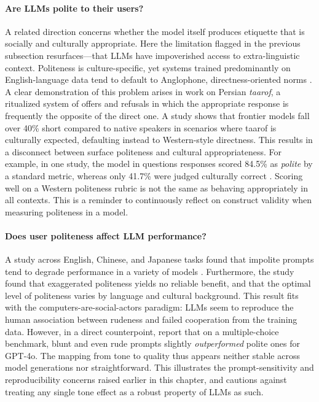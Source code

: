\paragraph{Are LLMs polite to their users?}
A related  direction concerns whether the model itself produces etiquette that is socially and culturally appropriate. Here the limitation flagged in the previous subsection resurfaces---that LLMs have impoverished access to extra-linguistic context. Politeness is  culture-specific, yet systems trained predominantly on English-language data tend to default to Anglophone, directness-oriented norms \citep{havaldar2023comparing}. A clear demonstration of this problem arises in work on Persian \emph{taarof}, a ritualized system of offers and refusals in which the appropriate response is frequently the opposite of the direct one. A study shows that frontier models fall over 40\% short compared to native speakers in scenarios where taarof is culturally expected, defaulting instead to Western-style directness. This results in a disconnect between surface politeness and cultural appropriateness. For example, in one study, the model in questions responses scored 84.5\% as {\em polite} by a standard metric, whereas only 41.7\% were judged culturally correct \citep{goharisadr2025taarof}. Scoring well on a Western politeness rubric %
is not the same as behaving appropriately in all contexts. This is a reminder to continuously reflect on construct validity when measuring politeness in a model.

\paragraph{Does user politeness affect LLM performance?} \label{sec:politeness}
A study  across English, Chinese, and Japanese tasks found  that impolite prompts tend to degrade performance in a variety of models \citep{yin-etal-2024-respect}. Furthermore, the study found that exaggerated politeness yields no reliable benefit, and that the optimal level of politeness varies by language and cultural background. This result fits with the computers-are-social-actors paradigm: LLMs seem to reproduce the human association between rudeness and failed cooperation from the training data. However, in a direct counterpoint, \citet{dobariya2025tone} report that on a multiple-choice benchmark, blunt and even rude prompts slightly \emph{outperformed} polite ones for GPT-4o. The mapping from tone to quality thus appears neither stable across model generations nor straightforward. This illustrates the prompt-sensitivity and reproducibility concerns raised earlier in this chapter, and cautions against treating any single tone effect as a robust property of LLMs as such.

